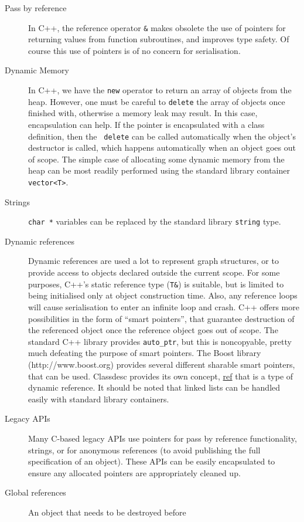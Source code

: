 \begin{description}
\item[Pass by reference] In C++, the reference operator \verb+&+ makes
  obsolete the use of pointers for returning values from function
  subroutines, and improves type safety. Of course this use of
  pointers is of no concern for serialisation.
\item[Dynamic Memory] In C++, we have the {\tt new} operator to return
  an array of objects from the heap. However, one must be careful to
  {\tt delete} the array of objects once finished with, otherwise a
  memory leak may result. In this case, encapsulation can help. If the
  pointer is encapsulated with a class definition, then the {\tt
    delete} can be called automatically when the object's destructor
  is called, which happens automatically when an object goes out of
  scope. The simple case of allocating some dynamic memory from the
  heap can be most readily performed using the standard library
  container \verb+vector<T>+.
\item[Strings] {\tt char *} variables can be replaced by the standard
  library {\tt string} type.
\item[Dynamic references] Dynamic references are used a lot to
  represent graph structures, or to provide access to objects declared
  outside the current scope. For some purposes, C++'s static reference
  type (\verb+T&+) is suitable, but is limited to being initialised
  only at object construction time. Also, any reference loops will
  cause serialisation to enter an infinite loop and crash. C++ offers
  more possibilities in the form of ``smart pointers'', that guarantee
  destruction of the referenced object once the reference object goes
  out of scope. The standard C++ library provides \verb+auto_ptr+, but
  this is noncopyable, pretty much defeating the purpose of smart
  pointers. The Boost library (http://www.boost.org) provides several
  different sharable smart pointers, that can be used. Classdesc
  provides its own concept, \hyperref{{\tt ref}}{ (see \S}{)}{ref} that
  is a type of dynamic reference.  It should be noted that linked
  lists can be handled easily with standard library containers.
\item[Legacy APIs] Many C-based legacy APIs use pointers for pass by
  reference functionality, strings, or for anonymous references (to
  avoid publishing the full specification of an object). These APIs
  can be easily encapsulated to ensure any allocated pointers are
  appropriately cleaned up.
\item[Global references] An object that needs to be destroyed before

\end{description}
